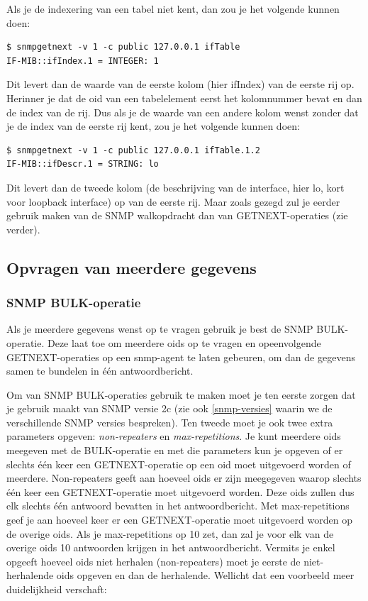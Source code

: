 Als je de indexering van een tabel niet kent, dan zou je het volgende kunnen doen:

\begin{lstlisting}[float=h, caption={SNMP GETNEXT-opdracht op een tabel}, label=netsnmp-getnext]
$ snmpgetnext -v 1 -c public 127.0.0.1 ifTable
IF-MIB::ifIndex.1 = INTEGER: 1
\end{lstlisting}

Dit levert dan de waarde van de eerste kolom (hier ifIndex) van de eerste rij op.
Herinner je dat de \gls{oid} van een tabelelement eerst het kolomnummer bevat en dan de index van de rij.
Dus als je de waarde van een andere kolom wenst zonder dat je de index van de eerste rij kent, zou je het volgende kunnen doen:

\begin{lstlisting}[float=h, caption={SNMP GETNEXT-opdracht op een kolom van een tabel}, label=netsnmp-getnextcol]
$ snmpgetnext -v 1 -c public 127.0.0.1 ifTable.1.2
IF-MIB::ifDescr.1 = STRING: lo
\end{lstlisting}

Dit levert dan de tweede kolom (de beschrijving van de interface, hier lo, kort voor loopback interface) op van de eerste rij.
Maar zoals gezegd zul je eerder gebruik maken van de SNMP walkopdracht dan van GETNEXT-operaties (zie verder).


\subsection{Opvragen van meerdere gegevens}

\subsubsection{SNMP BULK-operatie}
\label{bulk-voorbeelden}
Als je meerdere gegevens wenst op te vragen gebruik je best de SNMP BULK-operatie.
Deze laat toe om meerdere \glspl{oid} op te vragen en opeenvolgende GETNEXT-operaties op een \gls{snmp-agent} te laten gebeuren,
om dan de gegevens samen te bundelen in één antwoordbericht.

Om van SNMP BULK-operaties gebruik te maken moet je ten eerste zorgen dat je gebruik maakt van SNMP versie 2c
(zie ook \cref{snmp-versies} waarin we de verschillende SNMP versies bespreken).
Ten tweede moet je ook twee extra parameters opgeven: \textit{non-repeaters} en \textit{max-repetitions}.
Je kunt meerdere \glspl{oid} meegeven met de BULK-operatie en met die parameters kun je opgeven of er slechts één keer
een GETNEXT-operatie op een \gls{oid} moet uitgevoerd worden of meerdere.
Non-repeaters geeft aan hoeveel \glspl{oid} er zijn meegegeven waarop slechts één keer een GETNEXT-operatie moet uitgevoerd worden.
Deze \glspl{oid} zullen dus elk slechts één antwoord bevatten in het antwoordbericht.
Met max-repetitions geef je aan hoeveel keer er een GETNEXT-operatie moet uitgevoerd worden op de overige \glspl{oid}.
Als je max-repetitions op 10 zet, dan zal je voor elk van de overige \glspl{oid} 10 antwoorden krijgen in het antwoordbericht.
Vermits je enkel opgeeft hoeveel \glspl{oid} niet herhalen (non-repeaters) moet je eerste de niet-herhalende \glspl{oid} opgeven en dan de herhalende.
Wellicht dat een voorbeeld meer duidelijkheid verschaft:

